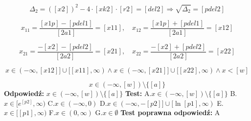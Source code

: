 \documentclass[12pt, a4paper]{article}
\theoremstyle{definition} %
\newcommand{\rozwStop}{\newline}                                            %
\newcommand{\odpStart}{\noindent \textbf{Odpowiedź:}\newline}    %
\newcommand{\odpStop}{\newline}                                             %
\newcommand{\testStart}{\noindent \textbf{Test:}\newline} %
\newcommand{\testStop}{\newline} %
\newcommand{\kluczStart}{\noindent \textbf{Test poprawna odpowiedź:}\newline} %
\newcommand{\kluczStop}{\newline} %
\begin{document}
$$\Delta_{2}=([x2])^{2}-4\cdot[xk2]\cdot[r2]=[del2] \Rightarrow \sqrt{\Delta_{2}}=[pdel2]$$

$$x_{11}=\frac{[x1p]-[pdel1]}{[2a1]}=[x11], \quad x_{12}=\frac{[x1p]+[pdel1]}{[2a1]}=[x12]$$

$$x_{21}=\frac{-[x2]-[pdel2]}{[2a2]}=[x21], \quad x_{22}=\frac{-[x2]+[pdel2]}{[2a2]}=[x22]$$

$$x\in(-\infty,[x12]]\cup[[x11],\infty) \land x\in(-\infty,[x21]]\cup[[x22],\infty) \land x<[w]$$

$$x\in(-\infty,[w])\setminus\{[a]\}$$
\rozwStop
\odpStart
$x\in(-\infty,[w])\setminus\{[a]\}$
\odpStop
\testStart
A.$x\in(-\infty,[w])\setminus\{[a]\}$
B.$x\in[e^{[p2]},\infty)$
C.$x\in(-\infty, 0)$
D.$x\in(-\infty, -[p2]] \cup [\ln[p1],\infty)$
E.$x\in[[p1],\infty)$
F.$x\in(0,\infty)$
G.$x\in\emptyset$
\testStop
\kluczStart
A
\kluczStop
\end{document}
